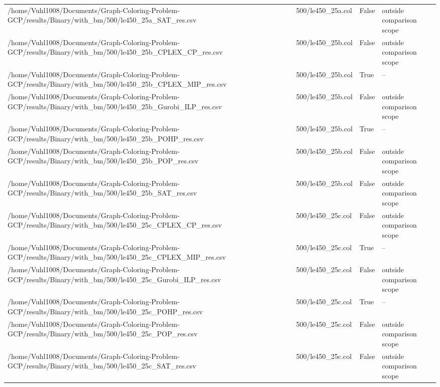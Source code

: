 \begin{table}[htbp]
\begin{tabular}{llll}
/home/Vuhl1008/Documents/Graph-Coloring-Problem-GCP/results/Binary/with\_bm/500/le450\_25a\_SAT\_res.csv & 500/le450\_25a.col & False & outside comparison scope \\
/home/Vuhl1008/Documents/Graph-Coloring-Problem-GCP/results/Binary/with\_bm/500/le450\_25b\_CPLEX\_CP\_res.csv & 500/le450\_25b.col & False & outside comparison scope \\
/home/Vuhl1008/Documents/Graph-Coloring-Problem-GCP/results/Binary/with\_bm/500/le450\_25b\_CPLEX\_MIP\_res.csv & 500/le450\_25b.col & True & -- \\
/home/Vuhl1008/Documents/Graph-Coloring-Problem-GCP/results/Binary/with\_bm/500/le450\_25b\_Gurobi\_ILP\_res.csv & 500/le450\_25b.col & False & outside comparison scope \\
/home/Vuhl1008/Documents/Graph-Coloring-Problem-GCP/results/Binary/with\_bm/500/le450\_25b\_POHP\_res.csv & 500/le450\_25b.col & True & -- \\
/home/Vuhl1008/Documents/Graph-Coloring-Problem-GCP/results/Binary/with\_bm/500/le450\_25b\_POP\_res.csv & 500/le450\_25b.col & False & outside comparison scope \\
/home/Vuhl1008/Documents/Graph-Coloring-Problem-GCP/results/Binary/with\_bm/500/le450\_25b\_SAT\_res.csv & 500/le450\_25b.col & False & outside comparison scope \\
/home/Vuhl1008/Documents/Graph-Coloring-Problem-GCP/results/Binary/with\_bm/500/le450\_25c\_CPLEX\_CP\_res.csv & 500/le450\_25c.col & False & outside comparison scope \\
/home/Vuhl1008/Documents/Graph-Coloring-Problem-GCP/results/Binary/with\_bm/500/le450\_25c\_CPLEX\_MIP\_res.csv & 500/le450\_25c.col & True & -- \\
/home/Vuhl1008/Documents/Graph-Coloring-Problem-GCP/results/Binary/with\_bm/500/le450\_25c\_Gurobi\_ILP\_res.csv & 500/le450\_25c.col & False & outside comparison scope \\
/home/Vuhl1008/Documents/Graph-Coloring-Problem-GCP/results/Binary/with\_bm/500/le450\_25c\_POHP\_res.csv & 500/le450\_25c.col & True & -- \\
/home/Vuhl1008/Documents/Graph-Coloring-Problem-GCP/results/Binary/with\_bm/500/le450\_25c\_POP\_res.csv & 500/le450\_25c.col & False & outside comparison scope \\
/home/Vuhl1008/Documents/Graph-Coloring-Problem-GCP/results/Binary/with\_bm/500/le450\_25c\_SAT\_res.csv & 500/le450\_25c.col & False & outside comparison scope \\

\end{tabular}
\end{table}

